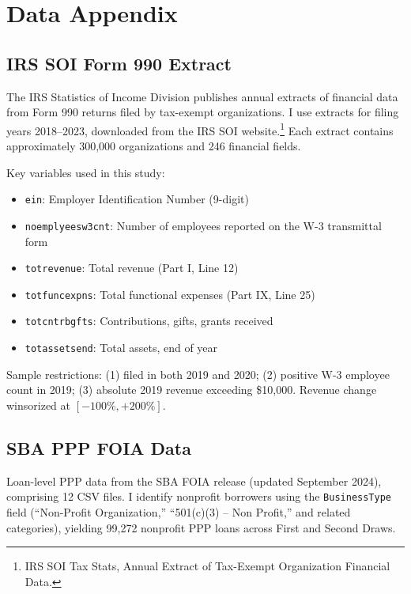 \documentclass[12pt]{article}
\begin{document}
\label{apep_main_text_end}
\newpage



\newpage
\appendix

\section{Data Appendix}

\subsection{IRS SOI Form 990 Extract}

The IRS Statistics of Income Division publishes annual extracts of financial data from Form 990 returns filed by tax-exempt organizations. I use extracts for filing years 2018--2023, downloaded from the IRS SOI website.\footnote{IRS SOI Tax Stats, Annual Extract of Tax-Exempt Organization Financial Data.} Each extract contains approximately 300,000 organizations and 246 financial fields.

Key variables used in this study:
\begin{itemize}
\item \texttt{ein}: Employer Identification Number (9-digit)
\item \texttt{noemplyeesw3cnt}: Number of employees reported on the W-3 transmittal form
\item \texttt{totrevenue}: Total revenue (Part I, Line 12)
\item \texttt{totfuncexpns}: Total functional expenses (Part IX, Line 25)
\item \texttt{totcntrbgfts}: Contributions, gifts, grants received
\item \texttt{totassetsend}: Total assets, end of year
\end{itemize}

Sample restrictions: (1) filed in both 2019 and 2020; (2) positive W-3 employee count in 2019; (3) absolute 2019 revenue exceeding \$10,000. Revenue change winsorized at $[-100\%, +200\%]$.

\subsection{SBA PPP FOIA Data}

Loan-level PPP data from the SBA FOIA release (updated September 2024), comprising 12 CSV files. I identify nonprofit borrowers using the \texttt{BusinessType} field (``Non-Profit Organization,'' ``501(c)(3) -- Non Profit,'' and related categories), yielding 99,272 nonprofit PPP loans across First and Second Draws.
\end{document}
